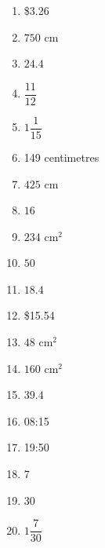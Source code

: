 \documentclass[11pt,a4paper]{article}
\begin{document}
\begin{multicols}{2}
\begin{enumerate}
\item \$3.26
\item $750$ cm
\item $24.4$
\item $\dfrac{11}{12}$
\item $1\dfrac{1}{15}$
\item 149 centimetres
\item $425$ cm
\item $16$
\item $234\text{ cm}^2$
\item $50$
\item $18.4$
\item \$15.54
\item $48\text{ cm}^2$
\item $160\text{ cm}^2$
\item $39.4$
\item 08:15
\item 19:50
\item 7
\item $30$
\item $1\dfrac{7}{30}$
\end{enumerate}
\end{multicols}
\end{document}
